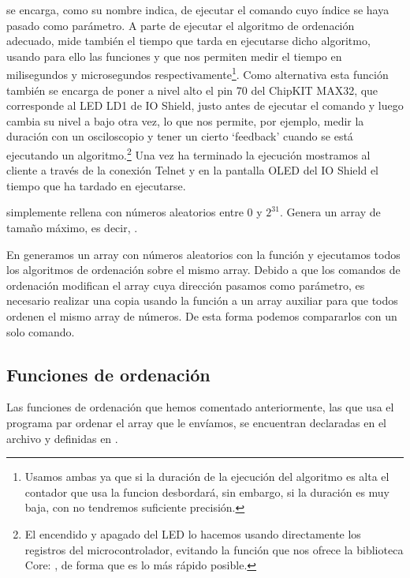 
 se encarga, como su nombre indica, de ejecutar el comando cuyo índice se haya pasado como parámetro. A parte de ejecutar el algoritmo de ordenación adecuado,  mide también el tiempo que tarda en ejecutarse dicho algoritmo, usando para ello las funciones  y  que nos permiten medir el tiempo en milisegundos y microsegundos respectivamente\footnote{Usamos ambas ya que si la duración de la ejecución del algoritmo es alta el contador que usa la funcion  desbordará, sin embargo, si la duración es muy baja, con  no tendremos suficiente precisión.}. Como alternativa esta función también se encarga de poner a nivel alto el pin 70 del ChipKIT MAX32, que corresponde al LED LD1 de IO Shield, justo antes de ejecutar el comando y luego cambia su nivel a bajo otra vez, lo que nos permite, por ejemplo, medir la duración con un osciloscopio y tener un cierto `feedback' cuando se está ejecutando un algoritmo.\footnote{El encendido y apagado del LED lo hacemos usando directamente los registros del microcontrolador, evitando la función que nos ofrece la biblioteca Core: , de forma que es lo más rápido posible.} Una vez ha terminado la ejecución mostramos al cliente a través de la conexión Telnet y en la pantalla OLED del IO Shield el tiempo que ha tardado en ejecutarse.


 simplemente rellena  con números aleatorios entre 0 y \(2^{31}\). Genera un array de tamaño máximo, es decir, .


En  generamos un array con números aleatorios con la función  y ejecutamos todos los algoritmos de ordenación sobre el mismo array. Debido a que los comandos de ordenación modifican el array cuya dirección pasamos como parámetro, es necesario realizar una copia usando la función  a un array auxiliar para que todos ordenen el mismo array de números. De esta forma podemos compararlos con un solo comando.

\subsection{Funciones de ordenación}
Las funciones de ordenación que hemos comentado anteriormente, las que usa el programa par ordenar el array que le envíamos, se encuentran declaradas en el archivo  y definidas en .

